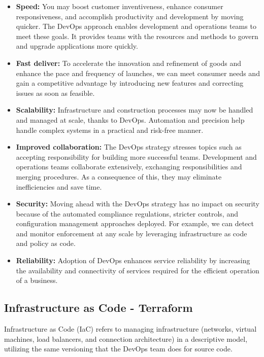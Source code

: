 \begin{itemize}[label=\textbullet]
    \item \textbf{Speed:} You may boost customer inventiveness, enhance consumer responsiveness, and accomplish productivity and development by moving quicker. The DevOps approach enables development and operations teams to meet these goals. It provides teams with the resources and methods to govern and upgrade applications more quickly.
     \item \textbf{Fast deliver:} To accelerate the innovation and refinement of goods and enhance the pace and frequency of launches, we can meet consumer needs and gain a competitive advantage by introducing new features and correcting issues as soon as feasible.
      \item \textbf{Scalability:} Infrastructure and construction processes may now be handled and managed at scale, thanks to DevOps. Automation and precision help handle complex systems in a practical and risk-free manner.
       \item \textbf{Improved collaboration:} The DevOps strategy stresses topics such as accepting responsibility for building more successful teams. Development and operations teams collaborate extensively, exchanging responsibilities and merging procedures. As a consequence of this, they may eliminate inefficiencies and save time.
        \item \textbf{Security:} Moving ahead with the DevOps strategy has no impact on security because of the automated compliance regulations, stricter controls, and configuration management approaches deployed. For example, we can detect and monitor enforcement at any scale by leveraging infrastructure as code and policy as code.
         \item \textbf{Reliability:} Adoption of DevOps enhances service reliability by increasing the availability and connectivity of services required for the efficient operation of a business.
\end{itemize} 


\subsection{Infrastructure as Code - Terraform}

Infrastructure as Code (IaC) refers to managing infrastructure (networks, virtual machines, load balancers, and connection architecture) in a descriptive model, utilizing the same versioning that the DevOps team does for source code.

